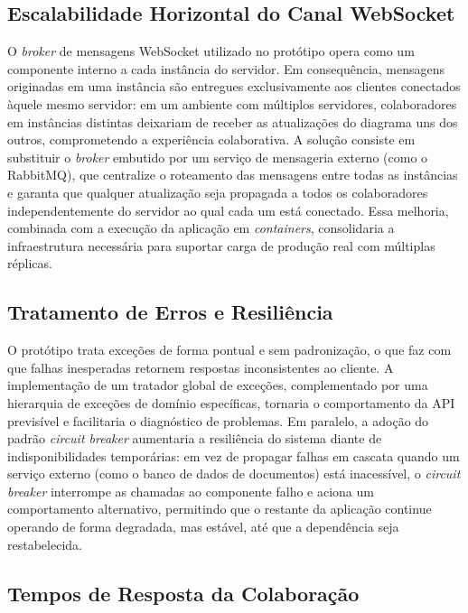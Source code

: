 \subsection{Escalabilidade Horizontal do Canal WebSocket}

O \textit{broker} de mensagens WebSocket utilizado no protótipo opera como um componente interno a cada instância do servidor. Em consequência, mensagens originadas em uma instância são entregues exclusivamente aos clientes conectados àquele mesmo servidor: em um ambiente com múltiplos servidores, colaboradores em instâncias distintas deixariam de receber as atualizações do diagrama uns dos outros, comprometendo a experiência colaborativa. A solução consiste em substituir o \textit{broker} embutido por um serviço de mensageria externo (como o RabbitMQ), que centralize o roteamento das mensagens entre todas as instâncias e garanta que qualquer atualização seja propagada a todos os colaboradores independentemente do servidor ao qual cada um está conectado. Essa melhoria, combinada com a execução da aplicação em \textit{containers}, consolidaria a infraestrutura necessária para suportar carga de produção real com múltiplas réplicas.

\subsection{Tratamento de Erros e Resiliência}

O protótipo trata exceções de forma pontual e sem padronização, o que faz com que falhas inesperadas retornem respostas inconsistentes ao cliente. A implementação de um tratador global de exceções, complementado por uma hierarquia de exceções de domínio específicas, tornaria o comportamento da API previsível e facilitaria o diagnóstico de problemas. Em paralelo, a adoção do padrão \textit{circuit breaker} aumentaria a resiliência do sistema diante de indisponibilidades temporárias: em vez de propagar falhas em cascata quando um serviço externo (como o banco de dados de documentos) está inacessível, o \textit{circuit breaker} interrompe as chamadas ao componente falho e aciona um comportamento alternativo, permitindo que o restante da aplicação continue operando de forma degradada, mas estável, até que a dependência seja restabelecida.

\subsection{Tempos de Resposta da Colaboração}

